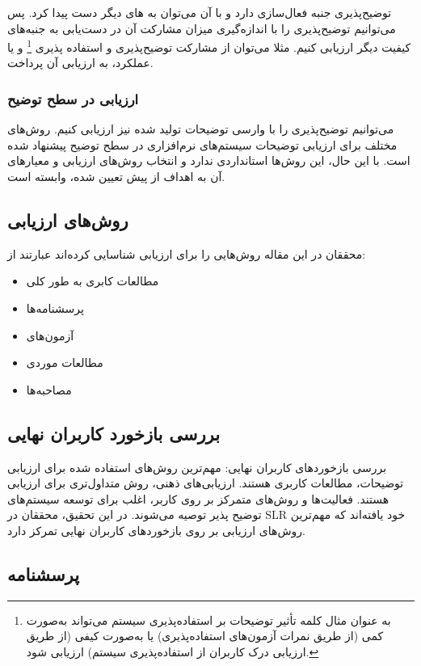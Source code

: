 توضیح‌پذیری جنبه فعال‌سازی دارد و با آن می‌توان به های دیگر دست پیدا
کرد. پس می‌توانیم توضیح‌پذیری را با اندازه‌گیری میزان مشارکت آن در دست‌یابی به
جنبه‌های کیفیت دیگر ارزیابی کنیم. مثلا می‌توان از مشارکت توضیح‌پذیری و استفاده
پذیری \footnote{ به عنوان مثال کلمه  تأثیر توضیحات بر
استفاده‌پذیری سیستم می‌تواند به‌صورت کمی (از طریق نمرات آزمون‌های استفاده‌پذیری)
یا به‌صورت کیفی (از طریق ارزیابی درک کاربران از استفاده‌پذیری سیستم) ارزیابی
شود.} و یا عملکرد، به ارزیابی آن پرداخت.

\subsubsection{ارزیابی در سطح توضیح}

می‌توانیم توضیح‌پذیری را با وارسی توضیحات تولید شده نیز ارزیابی کنیم. روش‌های
مختلف برای ارزیابی توضیحات سیستم‌های نرم‌افزاری در سطح توضیح پیشنهاد شده است. با
این حال، این روش‌ها استانداردی ندارد و انتخاب روش‌های ارزیابی و معیارهای آن به
اهداف از پیش تعیین شده، وابسته است.

\subsection{روش‌های ارزیابی}

محققان در این مقاله روش‌هایی را برای ارزیابی شناسایی کرده‌اند عبارتند از:

\begin{itemize}
    \item مطالعات کابری به طور کلی
    \item پرسشنامه‌ها
    \item آزمون‌های 
    \item مطالعات موردی
    \item مصاحبه‌ها
\end{itemize}

\subsection{بررسی بازخورد کاربران نهایی}

بررسی بازخوردهای کاربران نهایی: مهم‌ترین روش‌های استفاده شده برای ارزیابی
توضیحات، مطالعات کاربری هستند. ارزیابی‌های ذهنی، روش متداول‌تری برای ارزیابی
هستند. فعالیت‌ها و روش‌های متمرکز بر روی کاربر، اغلب برای توسعه سیستم‌های توضیح
پذیر توصیه می‌شوند. در این تحقیق، محققان در SLR خود یافته‌اند که مهم‌ترین
روش‌های ارزیابی بر روی بازخوردهای کاربران نهایی تمرکز دارد.

\subsection{پرسشنامه}

